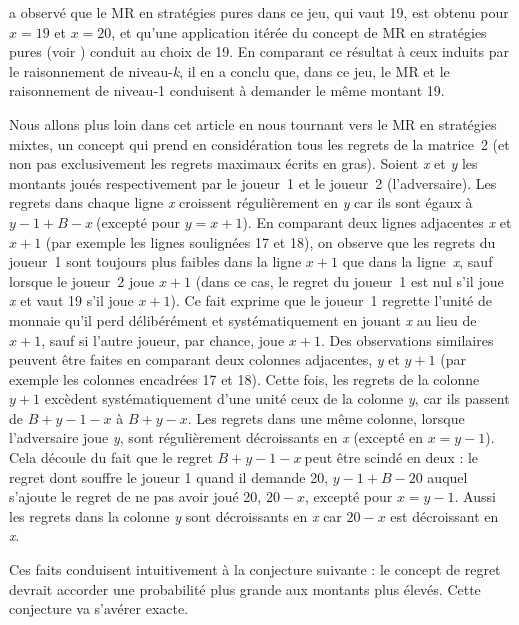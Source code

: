 \begin{Article}
\begin{refsection}[UmbhauerFR]
\textcite{garciapola2020} a observé que le MR en stratégies pures dans ce
jeu, qui vaut 19, est obtenu pour \(x = 19\) et \(x = 20\), et qu'une
application itérée du concept de MR en stratégies pures (voir \textcite{halpern2012}) conduit au choix de 19. En comparant ce résultat à ceux
induits par le raisonnement de niveau-\emph{k}, il en a conclu que, dans
ce jeu, le MR et le raisonnement de niveau-1 conduisent à demander le
même montant 19.

Nous allons plus loin dans cet article en nous tournant vers le MR en
stratégies mixtes, un concept qui prend en considération tous les
regrets de la matrice~2 (et non pas exclusivement les regrets maximaux
écrits en gras). Soient \emph{x} et \emph{y} les montants
joués respectivement par le joueur~1 et le joueur~2 (l'adversaire). Les
regrets dans chaque ligne \emph{x} croissent régulièrement en \emph{y} car ils
sont égaux à \(y - 1 + B - x\ \)(excepté pour \(y = x + 1\)). En
comparant deux lignes adjacentes \emph{x} et \(x + 1\) (par exemple les
lignes soulignées 17 et 18), on observe que les regrets du joueur~1 sont
toujours plus faibles dans la ligne \(x + 1\) que dans la ligne~\emph{x}, sauf lorsque le joueur~2 joue \(x + 1\) (dans ce cas, le
regret du joueur~1 est nul s'il joue \emph{x} et vaut 19 s'il joue
\(x + 1\)). Ce fait exprime que le joueur~1 regrette l'unité de monnaie
qu'il perd délibérément et systématiquement en jouant \emph{x} au lieu
de \(x + 1\), sauf si l'autre joueur, par chance, joue \(x + 1\). Des
observations similaires peuvent être faites en comparant deux colonnes
adjacentes, \emph{y} et \(y + 1\) (par exemple les colonnes encadrées 17
et 18). Cette fois, les regrets de la colonne \(y + 1\) excèdent
systématiquement d'une unité ceux de la colonne \emph{y}, car ils
passent de \(B + y - 1 - x\) à \(B + y - x\). Les regrets dans une même
colonne, lorsque l'adversaire joue \emph{y}, sont régulièrement
décroissants en \emph{x} (excepté en \(x = y - 1\)). Cela découle du
fait que le regret \(B + y - 1 - x\ \)peut être scindé en deux : le
regret dont souffre le joueur 1 quand il demande 20, \(y - 1 + B - 20\)
auquel s'ajoute le regret de ne pas avoir joué 20, \(20 - x\), excepté
pour \(x = y - 1\). Aussi les regrets dans la colonne \emph{y} sont
décroissants en \emph{x} car \(20 - x\) est décroissant en \emph{x}.

Ces faits conduisent intuitivement à la conjecture suivante : le concept
de regret devrait accorder une probabilité plus grande aux montants plus
élevés. Cette conjecture va s'avérer exacte.


\end{refsection}
\end{Article}
